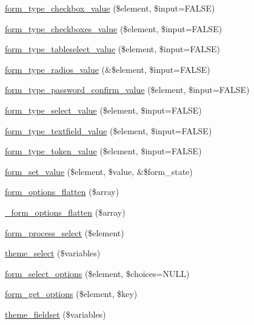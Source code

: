 \begin{DoxyCompactItemize}
\hyperlink{group__form__api_gae6014b94202e1d6e5c55421fc5b7d368}{form\_\-type\_\-checkbox\_\-value} (\$element, \$input=FALSE)
\item 
\hyperlink{group__form__api_gaab8c7b8878c056d35d6000bb0fab3b2b}{form\_\-type\_\-checkboxes\_\-value} (\$element, \$input=FALSE)
\item 
\hyperlink{group__form__api_gad36759844e875d35e1e220e90c460984}{form\_\-type\_\-tableselect\_\-value} (\$element, \$input=FALSE)
\item 
\hyperlink{group__form__api_gaf0ad41f155f7ae8eae8386f3702b56f8}{form\_\-type\_\-radios\_\-value} (\&\$element, \$input=FALSE)
\item 
\hyperlink{group__form__api_ga3e473dba683cd32c95de1193f2a8fb94}{form\_\-type\_\-password\_\-confirm\_\-value} (\$element, \$input=FALSE)
\item 
\hyperlink{group__form__api_ga244474506f87e80bc91f5d1e3be2a35e}{form\_\-type\_\-select\_\-value} (\$element, \$input=FALSE)
\item 
\hyperlink{group__form__api_gaf2e351ecad2b3f0a3b319d110bf4b84b}{form\_\-type\_\-textfield\_\-value} (\$element, \$input=FALSE)
\item 
\hyperlink{group__form__api_ga0f9d352bfa7b36285b8ba1bf9fe3c9ca}{form\_\-type\_\-token\_\-value} (\$element, \$input=FALSE)
\item 
\hyperlink{group__form__api_ga2a377a1fcccea79d06d1a735dea433f3}{form\_\-set\_\-value} (\$element, \$value, \&\$form\_\-state)
\item 
\hyperlink{group__form__api_ga683d5114e3e455ffee9bbfbb8b947bb7}{form\_\-options\_\-flatten} (\$array)
\item 
\hyperlink{group__form__api_gabd44cc736d333ca82ef8c6d1dba2dc96}{\_\-form\_\-options\_\-flatten} (\$array)
\item 
\hyperlink{group__form__api_ga1a2156b4aa18f567264d8c7aafd85dca}{form\_\-process\_\-select} (\$element)
\item 
\hyperlink{group__themeable_ga1d5214969fb2a9be57eb444d3ec0ade2}{theme\_\-select} (\$variables)
\item 
\hyperlink{group__form__api_ga018022f493d295538cb6d8d312dab866}{form\_\-select\_\-options} (\$element, \$choices=NULL)
\item 
\hyperlink{group__form__api_ga88bf27e1f6246789acc77dd1686e0276}{form\_\-get\_\-options} (\$element, \$key)
\item 
\hyperlink{group__themeable_gaf7f2e634c1a429fd6a1c176ff2be91a9}{theme\_\-fieldset} (\$variables)
\item 

\end{DoxyCompactItemize}
